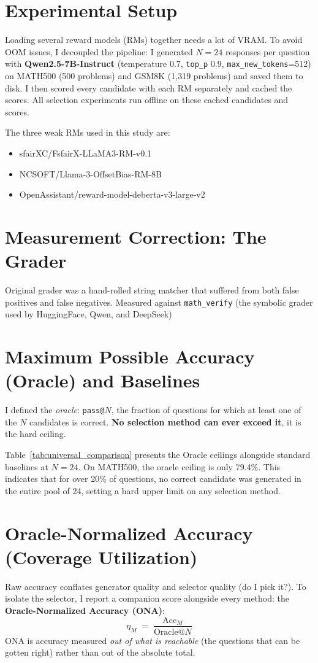 \documentclass[a4paper,11pt]{article}
\begin{document}
\section{Experimental Setup}
Loading several reward models (RMs) together needs a lot of VRAM. To avoid OOM issues, I decoupled the pipeline: I generated $N{=}24$ responses per question with \textbf{Qwen2.5-7B-Instruct} (temperature 0.7, \texttt{top\_p} 0.9, \texttt{max\_new\_tokens}=512) on MATH500 (500 problems) and GSM8K (1{,}319 problems) and saved them to disk. I then scored every candidate with each RM separately and cached the scores. All selection experiments run offline on these cached candidates and scores.

The three weak RMs used in this study are:
\begin{itemize}
    \item sfairXC/FsfairX-LLaMA3-RM-v0.1
    \item NCSOFT/Llama-3-OffsetBias-RM-8B
    \item OpenAssistant/reward-model-deberta-v3-large-v2
\end{itemize}

\section{Measurement Correction: The Grader}
\label{sec:grader}
Original grader was a hand-rolled string matcher that suffered from both false positives and false negatives. Measured against \texttt{math\_verify} (the symbolic grader used by HuggingFace, Qwen, and DeepSeek)

\section{Maximum Possible Accuracy (Oracle) and Baselines}
\label{sec:oracle}
I defined the \emph{oracle}: \texttt{pass@}$N$, the fraction of questions for which at least one of the $N$ candidates is correct. \textbf{No selection method can ever exceed it}, it is the hard ceiling. 

Table~\ref{tab:universal_comparison} presents the Oracle ceilings alongside standard baselines at $N=24$. On MATH500, the oracle ceiling is only 79.4\%. This indicates that for over 20\% of questions, no correct candidate was generated in the entire pool of 24, setting a hard upper limit on any selection method.

\section{Oracle-Normalized Accuracy (Coverage Utilization)}
\label{sec:ona}
Raw accuracy conflates generator quality and selector quality (do I pick it?). To isolate the selector, I report a companion score alongside every method: the \textbf{Oracle-Normalized Accuracy (ONA)}:
\begin{equation}
\eta_M \;=\; \frac{\mathrm{Acc}_M}{\mathrm{Oracle@}N}
\end{equation}
ONA is accuracy measured \emph{out of what is reachable} (the questions that can be gotten right) rather than out of the absolute total. 
\end{document}
